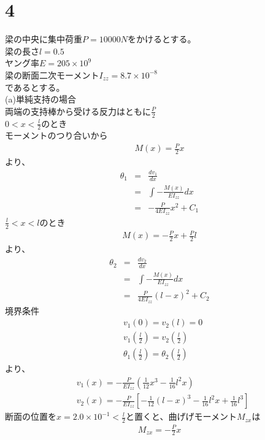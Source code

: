 \documentclass[pdflatex,ja=standard,fleqn]{bxjsarticle}
\begin{document}
\section*{4}
梁の中央に集中荷重$P=10000N$をかけるとする。\\
梁の長さ$l=0.5$\\
ヤング率$E=205×10^{9}$\\
梁の断面二次モーメント$I_{zz}=8.7×10^{-8}$\\
であるとする。\\
(a)単純支持の場合\\
両端の支持棒から受ける反力はともに$\frac{P}{2}$\\
$0<x<\frac{l}{2}$のとき\\
モーメントのつり合いから
\begin{eqnarray}
    M(x)=\frac{P}{2}x
\end{eqnarray}
より、
\begin{eqnarray}
    \theta_{1}&=&\frac{dv_{1}}{dx}\\
    &=&\int -\frac{M(x)}{EI_{zz}}dx\\
    &=&-\frac{P}{4EI_{zz}}x^{2}+C_{1}
\end{eqnarray}
$\frac{l}{2}<x<l$のとき
\begin{eqnarray}
    M(x)=-\frac{P}{2}x+\frac{P}{2}l
\end{eqnarray}
より、
\begin{eqnarray}
    \theta_{2}&=&\frac{dv_{2}}{dx}\\
    &=&\int -\frac{M(x)}{EI_{zz}}dx\\
    &=&\frac{P}{4EI_{zz}}(l-x)^{2}+C_{2}
\end{eqnarray}
境界条件
\begin{align}
    &v_{1}(0)=v_{2}(l)=0\\
    &v_1\left(\frac{l}{2}\right)=v_{2}\left(\frac{l}{2}\right)\\
    &\theta_{1}\left(\frac{l}{2}\right)=\theta_{2}\left(\frac{l}{2}\right)
\end{align}
より、
\begin{align}
    &v_{1}(x)=-\frac{P}{EI_{zz}}\left(\frac{1}{12}x^{3}-\frac{1}{16}l^{2}x\right)\\
    &v_{2}(x)=-\frac{P}{EI_{zz}}\left[-\frac{1}{12}(l-x)^{3}-\frac{1}{16}l^{2}x+\frac{1}{16}l^{3}\right]
\end{align}
断面の位置を$x=2.0×10^{-1}<\frac{l}{2}$と置くと、曲げげモーメント$M_{zx}$は
\begin{eqnarray}
    M_{zx}=-\frac{P}{2}x
\end{eqnarray}
\end{document}

